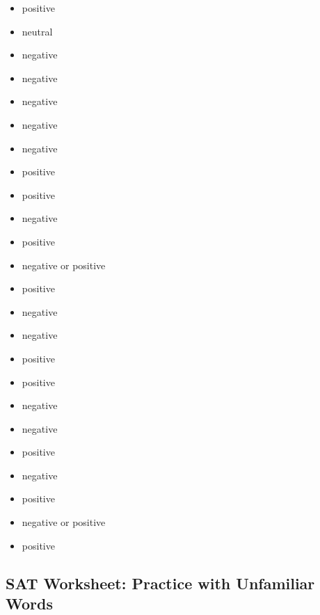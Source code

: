 \begin{enumerate}
\begin{itemize}
\item positive

\item neutral

\item negative

\item negative

\item negative

\item negative

\item negative

\item positive

\item positive

\item negative

\item positive

\item negative or positive

\item positive

\item negative

\item negative

\item positive

\item positive

\item negative

\item negative

\item positive

\item negative

\item positive

\item negative or positive

\item positive

\end{itemize}

\subsection{SAT Worksheet: Practice with Unfamiliar Words}


\end{enumerate}
